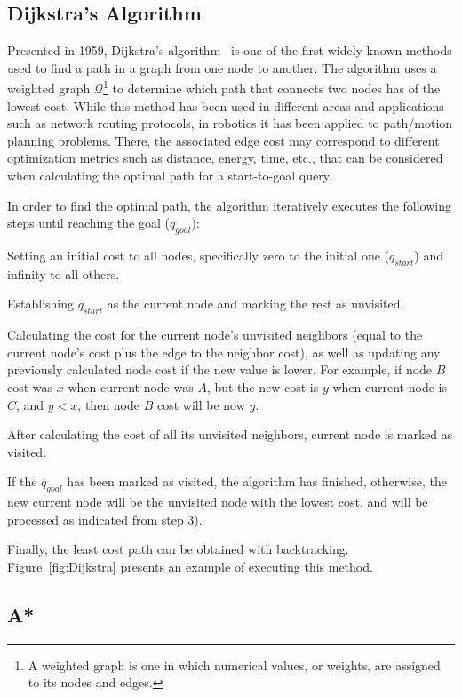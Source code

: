 \subsection{Dijkstra's Algorithm}

Presented in 1959, Dijkstra's algorithm~\cite{Dijkstra1959} is one of the first
widely known methods used to find a path in a graph from one node to another.
The algorithm uses a weighted graph $\mathcal{Q}$\footnote{A weighted graph is
one in which numerical values, or weights, are assigned to its nodes and edges.}
to determine which path that connects two nodes has of the lowest cost. While
this method has been used in different areas and applications such as network
routing protocols, in robotics it has been applied to path/motion planning
problems.
There, the associated edge cost may correspond to different optimization metrics
such as distance, energy, time, etc., that can be considered when calculating
the optimal path for a start-to-goal query.

In order to find the optimal path, the algorithm iteratively executes the
following steps until reaching the goal ($q_{goal}$):
\begin{inparaenum}[1)] \item Setting an initial cost to all nodes, specifically
zero to the initial one ($q_{start}$) and infinity to all others.
\item Establishing $q_{start}$ as the current node and marking the rest as
unvisited.
\item Calculating the cost for the current node's unvisited neighbors (equal to
the current node's cost plus the edge to the neighbor cost), as well as updating
any previously calculated node cost if the new value is lower.
For example, if node $B$ cost was $x$ when current node was $A$, but the new
cost is $y$ when current node is $C$, and $y<x$, then node $B$ cost will be now
$y$.
\item After calculating the cost of all its unvisited neighbors, current
node is marked as visited.
\item If the $q_{goal}$ has been marked as visited, the algorithm has finished,
otherwise, the new current node will be the unvisited node with the lowest
cost, and will be processed as indicated from step 3).
\end{inparaenum}
Finally, the least cost path can be obtained with backtracking.
Figure~\ref{fig:Dijkstra} presents an example of executing this method.

\subsection{A*}

